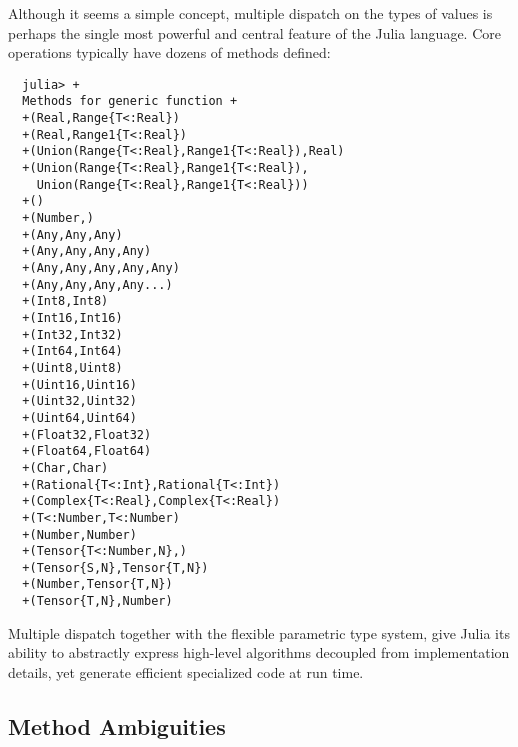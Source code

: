 \documentclass{article}
\begin{document}
Although it seems a simple concept, multiple dispatch on the types of values is perhaps the single most powerful and central feature of the Julia language.
Core operations typically have dozens of methods defined:
\begin{verbatim}
  julia> +
  Methods for generic function +
  +(Real,Range{T<:Real})
  +(Real,Range1{T<:Real})
  +(Union(Range{T<:Real},Range1{T<:Real}),Real)
  +(Union(Range{T<:Real},Range1{T<:Real}),
    Union(Range{T<:Real},Range1{T<:Real}))
  +()
  +(Number,)
  +(Any,Any,Any)
  +(Any,Any,Any,Any)
  +(Any,Any,Any,Any,Any)
  +(Any,Any,Any,Any...)
  +(Int8,Int8)
  +(Int16,Int16)
  +(Int32,Int32)
  +(Int64,Int64)
  +(Uint8,Uint8)
  +(Uint16,Uint16)
  +(Uint32,Uint32)
  +(Uint64,Uint64)
  +(Float32,Float32)
  +(Float64,Float64)
  +(Char,Char)
  +(Rational{T<:Int},Rational{T<:Int})
  +(Complex{T<:Real},Complex{T<:Real})
  +(T<:Number,T<:Number)
  +(Number,Number)
  +(Tensor{T<:Number,N},)
  +(Tensor{S,N},Tensor{T,N})
  +(Number,Tensor{T,N})
  +(Tensor{T,N},Number)
\end{verbatim}
Multiple dispatch together with the flexible parametric type system, give Julia its ability to abstractly express high-level algorithms decoupled from implementation details, yet generate efficient specialized code at run time.

\subsection{Method Ambiguities}
\end{document}
